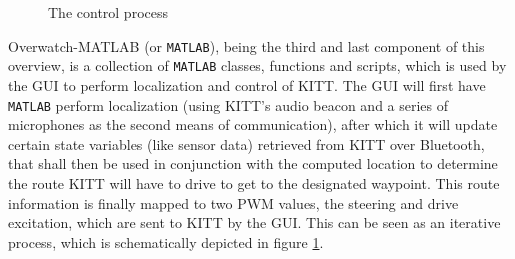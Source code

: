 \documentclass[11pt,titlepage]{report}
\begin{document}
\begin{figure}[H]
	\centering
	
	\caption{The control process}
	\label{fig:system-overview-process}
\end{figure}

Overwatch-MATLAB (or \texttt{MATLAB}), being the third and last component of this overview, is a collection of \texttt{MATLAB} classes, functions and scripts, which is used by the GUI to perform localization and control of KITT. The GUI will first have \texttt{MATLAB} perform localization (using KITT's audio beacon and a series of microphones as the second means of communication), after which it will update certain state variables (like sensor data) retrieved from KITT over Bluetooth, that shall then be used in conjunction with the computed location to determine the route KITT will have to drive to get to the designated waypoint. This route information is finally mapped to two PWM values, the steering and drive excitation, which are sent to KITT by the GUI.
This can be seen as an iterative process, which is schematically depicted in figure \ref{fig:system-overview-process}.
\end{document}
